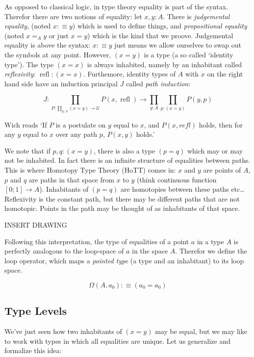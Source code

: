 \documentclass{article}
\DeclareMathOperator{\refl}{refl}
\begin{document}
As opposed to classical logic, in type theory equality is part of the syntax. Therefor there are two notions of equality: let $x,y : A$. There is \emph{judgemental equality}, (noted $x :\equiv y$) which is used to define things, and \emph{propositional equality} (noted $x =_{A} y$ or just $x = y$) which is the kind that we proove. Judgemental equality is above the syntax: $x :\equiv y$ just means we allow ourselves to swap out the symbols at any point. However, $(x = y)$ is a type (a so called `identity type'). The type $(x = x)$ is always inhabited, namely by an inhabitant called \emph{reflexivity}: $\refl : (x = x)$. Furthemore, identity types of $A$ with $x$ on the right hand side have an induction principal $J$ called \emph{path induction}:

\[J : \prod_{P : \prod_{y : A} (x = y) \to \mathcal{U}} P(x, \refl) \to \prod_{y: A} \prod_{p : (x = y)} P(y,p)\]

Wich reads `If $P$ is a postulate on $y$ equal to $x$, and $P(x,refl)$ holds, then for any $y$ equal to $x$ over any path $p$, $P(x,y)$ holds.'

We note that if $p,q : (x = y)$, there is also a type $(p = q)$ which may or may not be inhabited. In fact there is an infinite structure of equalities between paths. This is where Homotopy Type Theory (HoTT) comes in: $x$ and $y$ are points of $A$, $p$ and $q$ are paths in that space from $x$ to $y$ (think continuous function $\left[ 0;1\right] \to A$). Inhabitants of $(p = q)$ are homotopies between these paths etc\ldots Reflexivity is the constant path, but there may be different paths that are not homotopic. Points in the path may be thought of as inhabitants of that space.

INSERT DRAWING

Following this interpretation, the type of equalities of a point $a$ in a type $A$ is perfectly analogous to the loop-space of $a$ in the space $A$. Therefor we define the loop operator, which maps a \emph{pointed type} (a type and an inhabitant) to its loop space.

\[\Omega(A , a_0) :\equiv (a_0 = a_0)\]

\subsection{Type Levels}

We've just seen how two inhabitants of $(x = y)$ may be equal, but we may like to work with types in which all equalities are unique. Let us generalize and formalize this idea:
\end{document}

